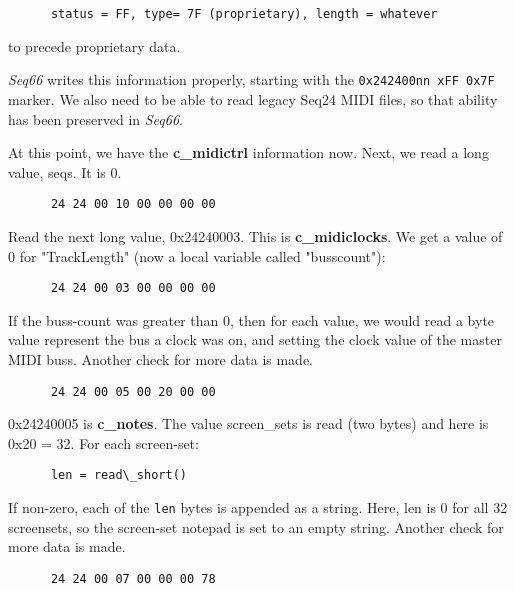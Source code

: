    \begin{verbatim}
      status = FF, type= 7F (proprietary), length = whatever
   \end{verbatim}

   to precede proprietary data.

   \textsl{Seq66} writes this information properly,
   starting with the \texttt{0x242400nn xFF 0x7F} marker.
   We also need to be able to read legacy Seq24 MIDI files, so that ability has
   been preserved in \textsl{Seq66}.

   At this point, we have the \textbf{c\_midictrl} information now.
   Next, we read a long value, seqs.  It is 0.

   \begin{verbatim}
      24 24 00 10 00 00 00 00
   \end{verbatim}

   Read the next long value, 0x24240003.  This is \textbf{c\_midiclocks}.
   We get a value of 0 for "TrackLength" (now a local variable called
   "busscount"):

   \begin{verbatim}
      24 24 00 03 00 00 00 00
   \end{verbatim}

   If the buss-count was greater than 0, then for each value, we would read a
   byte value represent the bus a clock was on, and setting the clock value
   of the master MIDI buss.
   Another check for more data is made.

   \begin{verbatim}
      24 24 00 05 00 20 00 00
   \end{verbatim}

   0x24240005 is \textbf{c\_notes}.  The value screen\_sets is read (two
   bytes) and
   here is 0x20 = 32.  For each screen-set:

   \begin{verbatim}
      len = read\_short()
   \end{verbatim}

   If non-zero, each of the \texttt{len} bytes is appended as a string.
   Here, len is 0 for all 32 screensets, so the screen-set notepad is set to
   an empty string.
   Another check for more data is made.

   \begin{verbatim}
      24 24 00 07 00 00 00 78
   \end{verbatim}

